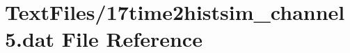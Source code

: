 \hypertarget{17time2histsim__channel5_8dat}{}\section{Text\+Files/17time2histsim\+\_\+channel5.dat File Reference}
\label{17time2histsim__channel5_8dat}
